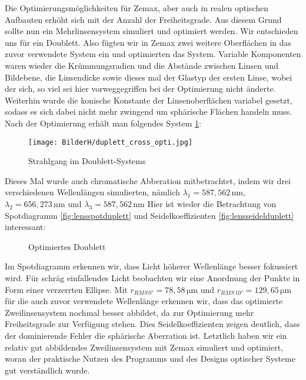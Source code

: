 \documentclass[twoside,colorback,accentcolor=tud4c,11pt]{tudreport}
\begin{document}
	Die Optimierungsmöglichkeiten für Zemax, aber auch in realen optischen Aufbauten erhöht sich mit der Anzahl der Freiheitsgrade. Aus diesem Grund sollte nun ein Mehrlinsensystem simuliert und optimiert werden. Wir entschieden uns für ein Doublett. Also fügten wir in Zemax zwei weitere Oberflächen in das zuvor verwendete System ein und optimierten das System. Variable Komponenten waren wieder die Krümmungsradien und die Abstände zwischen Linsen und Bildebene, die Linsendicke sowie dieses mal der Glastyp der ersten Linse, wobei der sich, so viel sei hier vorweggegriffen bei der Optimierung nicht änderte. Weiterhin wurde die konische Konstante der Linsenoberflächen variabel gesetzt, sodass es sich dabei nicht mehr zwingend um sphärische Flächen handeln muss. Nach der Optimierung erhält man folgendes System \ref{fig:lenscrossduplett}:
	
\begin{figure}[H]
\centering
   	\begin{minipage}[b]{\textwidth}
   	\centering
	   	
   	\texttt{[image: BilderH/duplett\_cross\_opti.jpg]}
   	\caption{Strahlgang im Doublett-Systems}\label{fig:lenscrossduplett} 
  	\end{minipage}
\end{figure}
	
	Dieses Mal wurde auch chromatische Abberation mitbetrachtet, indem wir drei verschiedenen Wellenlängen simulierten, nämlich $\lambda_1 = 587,562 \mathrm{\,nm}$, $\lambda_2 = 656,273 \mathrm{\,nm}$ und $\lambda_3 = 587,562 \mathrm{\,nm}$
	Hier ist wieder die Betrachtung von Spotdiagramm \ref{fig:lensspotduplett} und Seidelkoeffizienten \ref{fig:lensseidelduplett} interessant:
	
	\begin{figure}[H]
\centering
  \quad
  \quad   
  \caption{Optimiertes Doublett}
\end{figure}
	
	Im Spotdiagramm erkennen wir, dass Licht höherer Wellenlänge besser fokussiert wird. Für schräg einfallendes Licht beobachten wir eine Anordnung der Punkte in Form einer verzerrten Ellipse.
	  Mit $r_{RMS \, 0°} = 78,58 \mathrm{\,\mu m} $ und $r_{RMS \, 10°} = 129,65 \mathrm{\,\mu m} $ für die auch zuvor verwendete Wellenlänge erkennen wir, dass das optimierte Zweilinsensystem nochmal besser abbildet, da zur Optimierung mehr Freiheitsgrade zur Verfügung stehen. 
	 Dies Seidelkoeffizienten zeigen deutlich, dass der dominierende Fehler die sphärische Aberration ist. 
	  Letztlich haben wir ein relativ gut abbildendes Zweilinsensystem mit Zemax simuliert und optimiert, woran der praktische Nutzen des Programms und des Designs optischer Systeme gut verständlich wurde.
\end{document}
